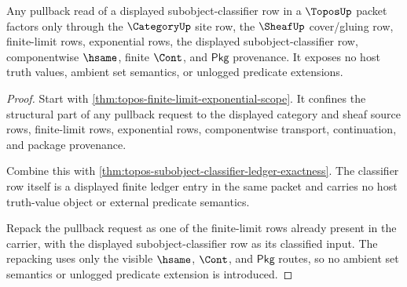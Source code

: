 \begin{theorem}
\label{thm:topos-subobject-classifier-pullback-boundary}
Any pullback read of a displayed subobject-classifier row in a $\ToposUp$
packet factors only through the $\CategoryUp$ site row, the $\SheafUp$
cover/gluing row, finite-limit rows, exponential rows, the displayed
subobject-classifier row, componentwise $\hsame$, finite $\Cont$, and
$\mathsf{Pkg}$ provenance. It exposes no host truth values, ambient set
semantics, or unlogged predicate extensions.
\end{theorem}
\begin{proof}
Start with \autoref{thm:topos-finite-limit-exponential-scope}. It confines the
structural part of any pullback request to the displayed category and sheaf
source rows, finite-limit rows, exponential rows, componentwise transport,
continuation, and package provenance.

Combine this with
\autoref{thm:topos-subobject-classifier-ledger-exactness}. The classifier row
itself is a displayed finite ledger entry in the same packet and carries no
host truth-value object or external predicate semantics.

Repack the pullback request as one of the finite-limit rows already present in
the carrier, with the displayed subobject-classifier row as its classified
input. The repacking uses only the visible $\hsame$, $\Cont$, and
$\mathsf{Pkg}$ routes, so no ambient set semantics or unlogged predicate
extension is introduced.
\end{proof}

